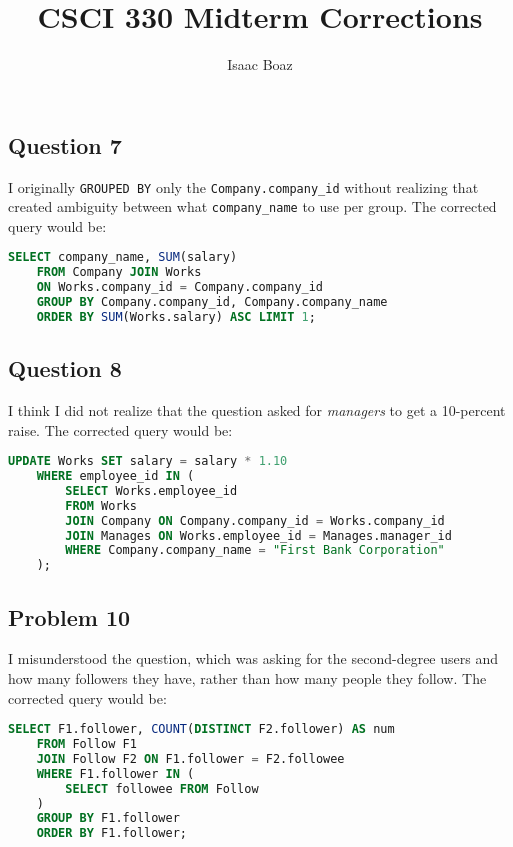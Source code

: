 \documentclass{article}
\title{\vspace{-5em}CSCI 330 Midterm Corrections}
\author{Isaac Boaz}
\begin{document}
\maketitle

\subsection*{Question 7}
I originally \lstinline|GROUPED BY| only the \lstinline|Company.company_id| without realizing that created ambiguity between what \lstinline|company_name| to use per group.
The corrected query would be:

\begin{lstlisting}[language=SQL]
    SELECT company_name, SUM(salary)
    FROM Company JOIN Works 
    ON Works.company_id = Company.company_id 
    GROUP BY Company.company_id, Company.company_name 
    ORDER BY SUM(Works.salary) ASC LIMIT 1;
\end{lstlisting}

\subsection*{Question 8}
I think I did not realize that the question asked for \textit{managers} to get a 10-percent raise.
The corrected query would be:

\begin{lstlisting}[language=SQL]
    UPDATE Works SET salary = salary * 1.10 
    WHERE employee_id IN (
        SELECT Works.employee_id
        FROM Works 
        JOIN Company ON Company.company_id = Works.company_id
        JOIN Manages ON Works.employee_id = Manages.manager_id
        WHERE Company.company_name = "First Bank Corporation"
    );
\end{lstlisting}

\subsection*{Problem 10}
I misunderstood the question, which was asking for the second-degree users and how many followers they have, rather than how many people they follow.
The corrected query would be:
\begin{lstlisting}[language=SQL]
    SELECT F1.follower, COUNT(DISTINCT F2.follower) AS num
    FROM Follow F1
    JOIN Follow F2 ON F1.follower = F2.followee
    WHERE F1.follower IN (
        SELECT followee FROM Follow
    )
    GROUP BY F1.follower
    ORDER BY F1.follower;
\end{lstlisting}
\end{document}

